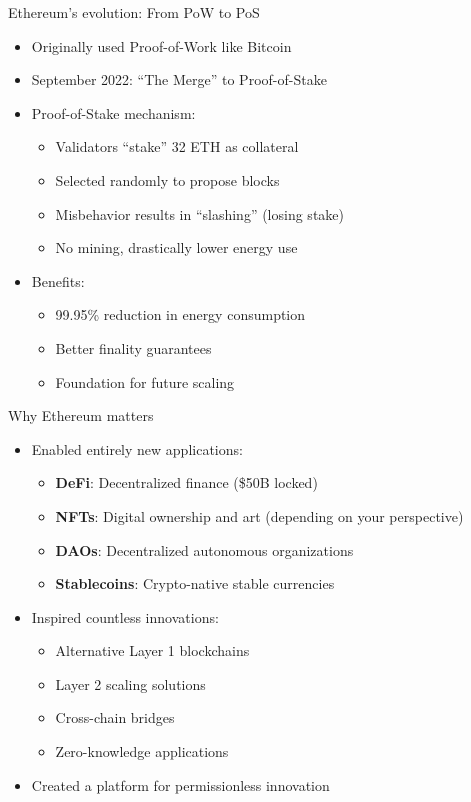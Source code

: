 \documentclass[aspectratio=169, lualatex, handout]{beamer}
\begin{document}
\begin{frame}{Ethereum's evolution: From PoW to PoS}
	\begin{itemize}
		\item Originally used Proof-of-Work like Bitcoin
		\item September 2022: ``The Merge'' to Proof-of-Stake
		\item Proof-of-Stake mechanism:
		      \begin{itemize}
			      \item Validators ``stake'' 32 ETH as collateral
			      \item Selected randomly to propose blocks
			      \item Misbehavior results in ``slashing'' (losing stake)
			      \item No mining, drastically lower energy use
		      \end{itemize}
		\item Benefits:
		      \begin{itemize}
			      \item 99.95\% reduction in energy consumption
			      \item Better finality guarantees
			      \item Foundation for future scaling
		      \end{itemize}
	\end{itemize}
\end{frame}

\begin{frame}{Why Ethereum matters}
	\begin{itemize}
		\item Enabled entirely new applications:
		      \begin{itemize}
			      \item \textbf{DeFi}: Decentralized finance (\approx\$50B locked)
			      \item \textbf{NFTs}: Digital ownership and art (depending on your perspective)
			      \item \textbf{DAOs}: Decentralized autonomous organizations
			      \item \textbf{Stablecoins}: Crypto-native stable currencies
		      \end{itemize}
		\item Inspired countless innovations:
		      \begin{itemize}
			      \item Alternative Layer 1 blockchains
			      \item Layer 2 scaling solutions
			      \item Cross-chain bridges
			      \item Zero-knowledge applications
		      \end{itemize}
		\item Created a platform for permissionless innovation
	\end{itemize}
\end{frame}
\end{document}
